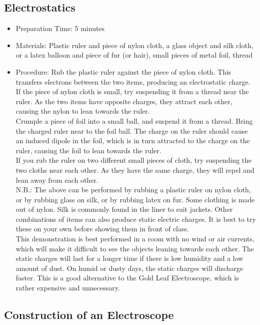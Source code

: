 \subsection{Electrostatics}
\begin{itemize}
\item{Preparation Time: 5 minutes}
\item{Materials: Plastic ruler and piece of nylon cloth, a glass object and silk cloth, or a latex balloon and piece of fur (or hair), small pieces of metal foil, thread}
\item{Procedure: Rub the plastic ruler against the piece of nylon cloth. This transfers electrons between the two items, producing an electrostatic charge. If the piece of nylon cloth is small, try suspending it from a thread near the ruler. As the two items have opposite charges, they attract each other, causing the nylon to lean towards the ruler.\\
Crumple a piece of foil into a small ball, and suspend it from a thread. Bring the charged ruler near to the foil ball. The charge on the ruler should cause an induced dipole in the foil, which is in turn attracted to the charge on the ruler, causing the foil to lean towards the ruler.\\
If you rub the ruler on two different small pieces of cloth, try suspending the two cloths near each other. As they have the same charge, they will repel and lean away from each other.\\
N.B.: The above can be performed by rubbing a plastic ruler on nylon cloth, or by rubbing glass on silk, or by rubbing latex on fur. Some clothing is made out of nylon. Silk is commonly found in the liner to suit jackets. Other combinations of items can also produce static electric charges. It is best to try these on your own before showing them in front of class.\\
This demonstration is best performed in a room with no wind or air currents, which will make it difficult to see the objects leaning towards each other. The static charges will last for a longer time if there is low humidity and a low amount of dust. On humid or dusty days, the static charges will discharge faster. This is a good alternative to the Gold Leaf Electroscope, which is rather expensive and unnecessary.}
\end{itemize}


\subsection{Construction of an Electroscope}

